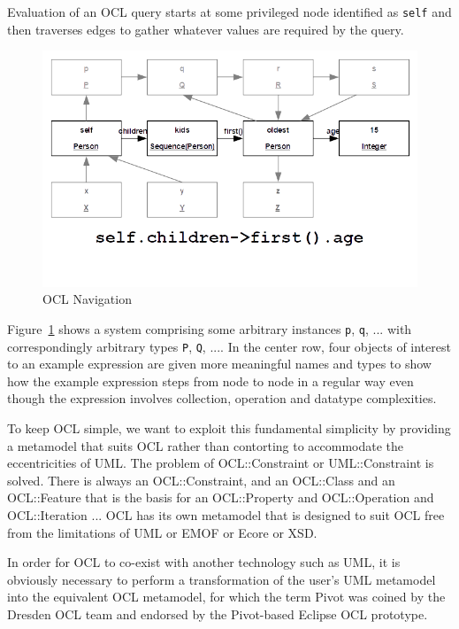 \documentclass{jot}
\begin{document}
Evaluation of an OCL query starts at some privileged node identified as \verb$self$ and then traverses edges to gather whatever values are required by the query.

\begin{figure}
	\begin{center}
		\includegraphics[width=4.5in]{OCLNavigation.png}
	\end{center}
	\vspace{-40pt}
	\caption{OCL Navigation}
	\label{fig:OCLNavigation}
\end{figure}

Figure~\ref{fig:OCLNavigation} shows a system comprising some arbitrary instances \verb$p$, \verb$q$, ... with correspondingly arbitrary types \verb$P$, \verb$Q$, .... In the center row, four objects of interest to an example expression are given more meaningful names and types to show how the example expression steps from node to node in a regular way even though the expression involves collection, operation and datatype complexities.

To keep OCL simple, we want to exploit this fundamental simplicity by providing a metamodel that suits OCL rather than contorting to accommodate the eccentricities of UML. The problem of OCL::Constraint or UML::Constraint is solved. There is always an OCL::Constraint, and an OCL::Class and an OCL::Feature that is the basis for an OCL::Property and OCL::Operation and OCL::Iteration ... OCL has its own metamodel that is designed to suit OCL free from the limitations of UML or EMOF or Ecore or XSD.

In order for OCL to co-exist with another technology such as UML, it is obviously necessary to perform a transformation of the user's UML metamodel into the equivalent OCL metamodel, for which the term Pivot was coined by the Dresden OCL \cite{Dresden-OCL} team and endorsed by the Pivot-based Eclipse OCL prototype.
\end{document}
